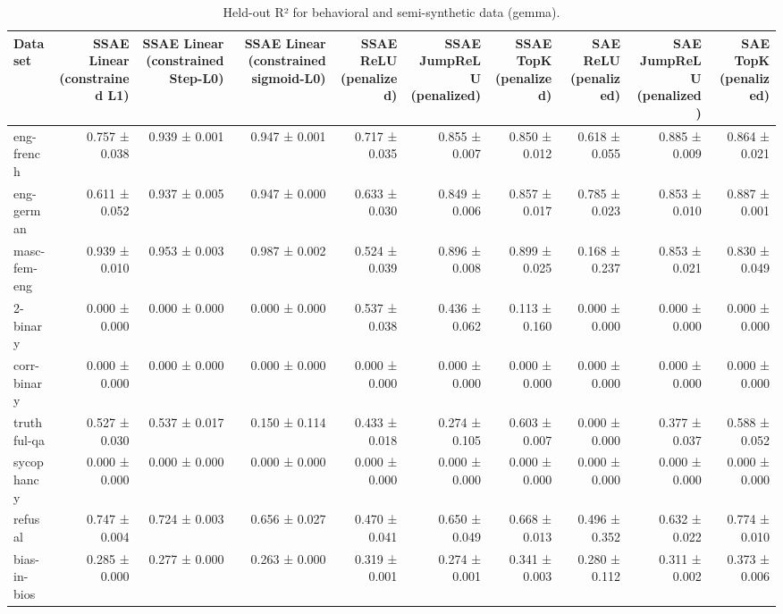 \begin{table}[t]
\centering
\caption{Held-out R² for behavioral and semi-synthetic data (gemma).}
\label{tab:all-datasets-gemma-r2}
\begin{tabular}{lrrrrrrrrr}
\toprule
Dataset & SSAE Linear (constrained L1) & SSAE Linear (constrained Step-L0) & SSAE Linear (constrained sigmoid-L0) & SSAE ReLU (penalized) & SSAE JumpReLU (penalized) & SSAE TopK (penalized) & SAE ReLU (penalized) & SAE JumpReLU (penalized) & SAE TopK (penalized) \\
\midrule
eng-french & 0.757 ± 0.038 & 0.939 ± 0.001 & 0.947 ± 0.001 & 0.717 ± 0.035 & 0.855 ± 0.007 & 0.850 ± 0.012 & 0.618 ± 0.055 & 0.885 ± 0.009 & 0.864 ± 0.021 \\
eng-german & 0.611 ± 0.052 & 0.937 ± 0.005 & 0.947 ± 0.000 & 0.633 ± 0.030 & 0.849 ± 0.006 & 0.857 ± 0.017 & 0.785 ± 0.023 & 0.853 ± 0.010 & 0.887 ± 0.001 \\
masc-fem-eng & 0.939 ± 0.010 & 0.953 ± 0.003 & 0.987 ± 0.002 & 0.524 ± 0.039 & 0.896 ± 0.008 & 0.899 ± 0.025 & 0.168 ± 0.237 & 0.853 ± 0.021 & 0.830 ± 0.049 \\
2-binary & 0.000 ± 0.000 & 0.000 ± 0.000 & 0.000 ± 0.000 & 0.537 ± 0.038 & 0.436 ± 0.062 & 0.113 ± 0.160 & 0.000 ± 0.000 & 0.000 ± 0.000 & 0.000 ± 0.000 \\
corr-binary & 0.000 ± 0.000 & 0.000 ± 0.000 & 0.000 ± 0.000 & 0.000 ± 0.000 & 0.000 ± 0.000 & 0.000 ± 0.000 & 0.000 ± 0.000 & 0.000 ± 0.000 & 0.000 ± 0.000 \\
truthful-qa & 0.527 ± 0.030 & 0.537 ± 0.017 & 0.150 ± 0.114 & 0.433 ± 0.018 & 0.274 ± 0.105 & 0.603 ± 0.007 & 0.000 ± 0.000 & 0.377 ± 0.037 & 0.588 ± 0.052 \\
sycophancy & 0.000 ± 0.000 & 0.000 ± 0.000 & 0.000 ± 0.000 & 0.000 ± 0.000 & 0.000 ± 0.000 & 0.000 ± 0.000 & 0.000 ± 0.000 & 0.000 ± 0.000 & 0.000 ± 0.000 \\
refusal & 0.747 ± 0.004 & 0.724 ± 0.003 & 0.656 ± 0.027 & 0.470 ± 0.041 & 0.650 ± 0.049 & 0.668 ± 0.013 & 0.496 ± 0.352 & 0.632 ± 0.022 & 0.774 ± 0.010 \\
bias-in-bios & 0.285 ± 0.000 & 0.277 ± 0.000 & 0.263 ± 0.000 & 0.319 ± 0.001 & 0.274 ± 0.001 & 0.341 ± 0.003 & 0.280 ± 0.112 & 0.311 ± 0.002 & 0.373 ± 0.006 \\
\bottomrule
\end{tabular}
\end{table}
